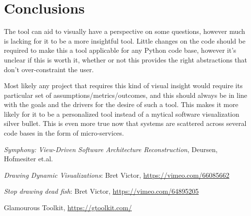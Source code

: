 \documentclass[a4paper,11pt]{article}
\begin{document}
\section{Conclusions}
\label{sec:org64d87fd}

The tool can aid to visually have a perspective on some questions, however much is lacking for it to be a more insightful tool. Little changes on the code should be required to make this a tool applicable for any Python code base, however it's unclear if this is worth it, whether or not this provides the right abstractions that don't over-constraint the user.

Most likely any project that requires this kind of visual insight would require its particular set of assumptions/metrics/outcomes, and this should always be in line with the goals and the drivers for the desire of such a tool. This makes it more likely for it to be a personalized tool instead of a mytical software visualization silver bullet. This is even more true now that systems are scattered across several code bases in the form of micro-services.

\begin{thebibliography}{9}
\textit{Symphony: View-Driven Software Architecture Reconstruction}, Deursen, Hofmesiter et.al.

\textit{Drawing Dynamic Visualizations}: Bret Victor, \href{https://vimeo.com/66085662}{https://vimeo.com/66085662}

\textit{Stop drawing dead fish}: Bret Victor, \href{https://vimeo.com/64895205}{https://vimeo.com/64895205}

 Glamourous Toolkit, \href{https://gtoolkit.com/}{https://gtoolkit.com/}
\end{thebibliography}
\end{document}
